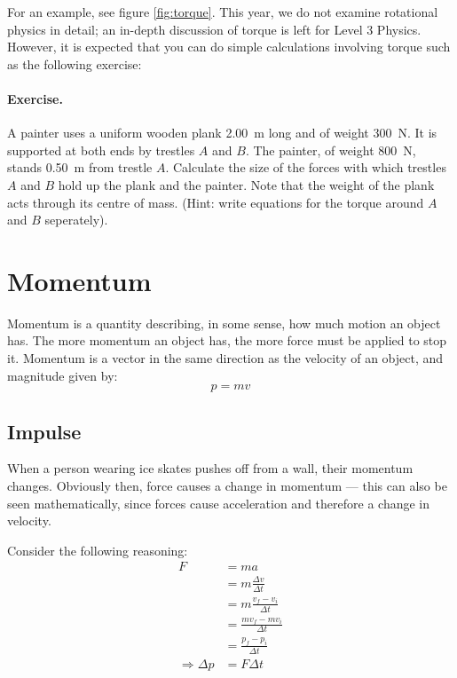 \documentclass[a4paper]{amsbook}
\begin{document}
For an example, see figure \ref{fig:torque}. This year, we do not examine rotational physics in detail; an in-depth
discussion of torque is left for Level 3 Physics. However, it is expected that you can do simple calculations involving
torque such as the following exercise:

\paragraph{Exercise.} A painter uses a uniform wooden plank \SI{2.00}{\metre} long and of weight \SI{300}{\newton}.
It is supported at both ends by trestles $ A $ and $ B $. The painter, of weight \SI{800}{\newton}, stands \SI{0.50}{\metre}
from trestle $ A $. Calculate the size of the forces with which trestles $ A $ and $ B $ hold up the plank and the painter.
Note that the weight of the plank acts through its centre of mass. (Hint: write equations for the torque around $ A $
and $ B $ seperately).

\section{Momentum}
Momentum is a quantity describing, in some sense, how much motion an object has. The more momentum an object
has, the more force must be applied to stop it. Momentum is a vector in the same direction as the velocity of
an object, and magnitude given by:
\begin{equation}
  p = mv
\end{equation}

\subsection{Impulse}
When a person wearing ice skates pushes off from a wall, their momentum changes. Obviously then, force causes a change
in momentum --- this can also be seen mathematically, since forces cause acceleration and therefore a change in velocity.

Consider the following reasoning:
\begin{align*}
  F &= ma\\
  &= m \frac{\Delta v}{\Delta t}\\
  &= m \frac{v_f - v_i}{\Delta t}\\
  &= \frac{mv_f - mv_i}{\Delta t}\\
  &= \frac{p_f - p_i}{\Delta t}\\
  \Rightarrow \Delta p &= F \Delta t
\end{align*}
\end{document}
